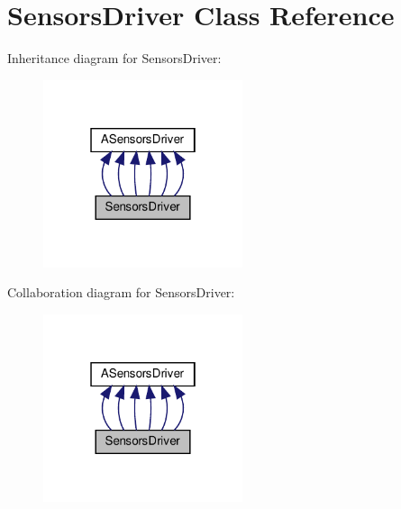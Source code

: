 \hypertarget{classSensorsDriver}{}\section{Sensors\+Driver Class Reference}
\label{classSensorsDriver}


Inheritance diagram for Sensors\+Driver\+:
\nopagebreak
\begin{figure}[H]
\begin{center}
\leavevmode
\includegraphics[width=166pt]{classSensorsDriver__inherit__graph}
\end{center}
\end{figure}


Collaboration diagram for Sensors\+Driver\+:
\nopagebreak
\begin{figure}[H]
\begin{center}
\leavevmode
\includegraphics[width=166pt]{classSensorsDriver__coll__graph}
\end{center}
\end{figure}
